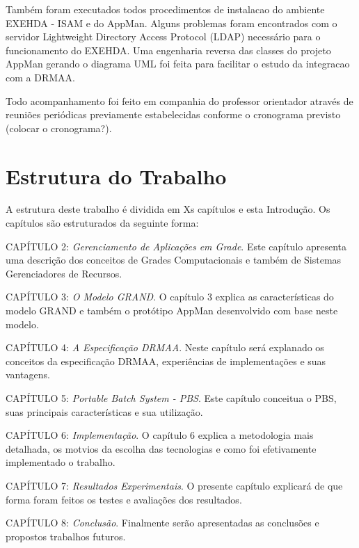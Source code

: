 Também foram executados todos procedimentos de instalacao do ambiente EXEHDA - ISAM e do AppMan. Alguns problemas foram encontrados com o servidor Lightweight Directory Access Protocol (LDAP) necessário para o funcionamento do EXEHDA. Uma engenharia reversa das classes do projeto AppMan gerando o diagrama UML foi feita para facilitar o estudo da integracao com a DRMAA.

Todo acompanhamento foi feito em companhia do professor orientador através de reuniões periódicas previamente estabelecidas conforme o cronograma previsto (colocar o cronograma?).

\section{Estrutura do Trabalho}
A estrutura deste trabalho é dividida em Xs capítulos e esta Introdução. Os capítulos são estruturados da seguinte forma:

CAPÍTULO 2: \emph{Gerenciamento de Aplicações em Grade}. Este capítulo apresenta uma descrição dos conceitos de Grades Computacionais e também de Sistemas Gerenciadores de Recursos.

CAPÍTULO 3: \emph{O Modelo GRAND}. O capítulo 3 explica as características do modelo GRAND e também o protótipo AppMan desenvolvido com base neste modelo.

CAPÍTULO 4: \emph{A Especificação DRMAA}. Neste capítulo será explanado os conceitos da especificação DRMAA, experiências de implementações e suas vantagens.

CAPÍTULO 5: \emph{Portable Batch System - PBS}. Este capítulo conceitua o PBS, suas principais características e sua utilização. 

CAPÍTULO 6: \emph{Implementação}. O capítulo 6 explica a metodologia mais detalhada, os motvios da escolha das tecnologias e como foi efetivamente implementado o trabalho.

CAPÍTULO 7: \emph{Resultados Experimentais}. O presente capítulo explicará de que forma foram feitos os testes e avaliações dos resultados.

CAPÍTULO 8: \emph{Conclusão}. Finalmente serão apresentadas as conclusões e propostos trabalhos futuros.
